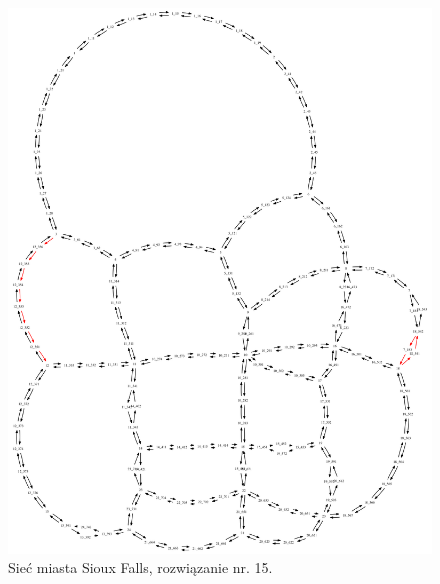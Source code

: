\documentclass[twoside,12pt]{report}
\begin{document}
\begin{figure}[ht]
\centering
\includegraphics[totalheight=0.580\textheight, angle=90]{img/sioux-out/15/network2}
\caption{Sieć miasta Sioux Falls, rozwiązanie nr. 15.}
\label{sioux15}
\end{figure}
\end{document}
